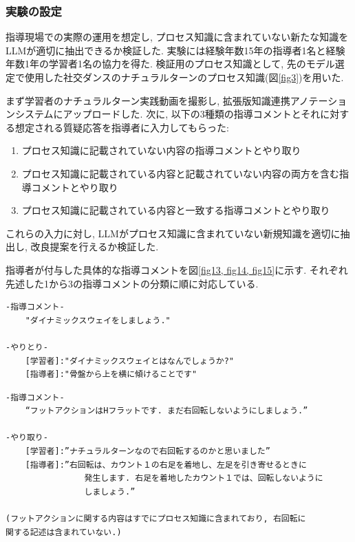 \subsubsection{実験の設定}
指導現場での実際の運用を想定し, プロセス知識に含まれていない新たな知識をLLMが適切に抽出できるか検証した. 実験には経験年数15年の指導者1名と経験年数1年の学習者1名の協力を得た. 検証用のプロセス知識として, 先のモデル選定で使用した社交ダンスのナチュラルターンのプロセス知識(図\ref{fig3})を用いた.

まず学習者のナチュラルターン実践動画を撮影し, 拡張版知識連携アノテーションシステムにアップロードした. 次に, 以下の3種類の指導コメントとそれに対する想定される質疑応答を指導者に入力してもらった:

\begin{enumerate}
    \item プロセス知識に記載されていない内容の指導コメントとやり取り
    
    \item プロセス知識に記載されている内容と記載されていない内容の両方を含む指導コメントとやり取り
    
    \item プロセス知識に記載されている内容と一致する指導コメントとやり取り
    
\end{enumerate}

これらの入力に対し, LLMがプロセス知識に含まれていない新規知識を適切に抽出し, 改良提案を行えるか検証した. 

指導者が付与した具体的な指導コメントを図\ref{fig13, fig14, fig15}に示す. それぞれ先述した1から3の指導コメントの分類に順に対応している.


\begin{tcolorbox}[breakable, colback=white, colframe=black]
    \begin{verbatim}
-指導コメント- 
    "ダイナミックスウェイをしましょう."

-やりとり- 
    [学習者]:"ダイナミックスウェイとはなんでしょうか?" 
    [指導者]:"骨盤から上を横に傾けることです" 
    \end{verbatim}
\end{tcolorbox}
    
\label{fig13}




\begin{tcolorbox}[breakable, colback=white, colframe=black]
    \begin{verbatim}
-指導コメント-
    “フットアクションはHフラットです. まだ右回転しないようにしましょう.”

-やり取り-
    [学習者]:”ナチュラルターンなので右回転するのかと思いました”
    [指導者]:”右回転は、カウント１の右足を着地し、左足を引き寄せるときに
                発生します. 右足を着地したカウント１では、回転しないように
                しましょう.”

(フットアクションに関する内容はすでにプロセス知識に含まれており, 右回転に
関する記述は含まれていない.)
    \end{verbatim}
\end{tcolorbox}
    
